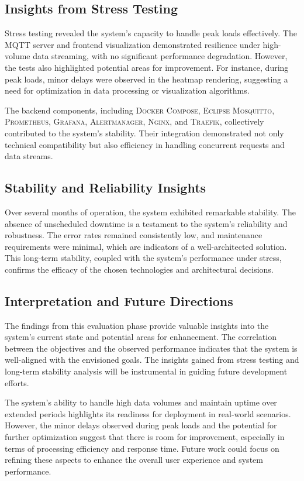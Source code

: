 \subsection{Insights from Stress Testing}
Stress testing revealed the system's capacity to handle peak loads effectively. The MQTT server and frontend visualization demonstrated resilience under high-volume data streaming, with no significant performance degradation. However, the tests also highlighted potential areas for improvement. For instance, during peak loads, minor delays were observed in the heatmap rendering, suggesting a need for optimization in data processing or visualization algorithms.

The backend components, including \textsc{Docker Compose}, \textsc{Eclipse Mosquitto}, \textsc{Prometheus}, \textsc{Grafana}, \textsc{Alertmanager}, \textsc{Nginx}, and \textsc{Traefik}, collectively contributed to the system's stability. Their integration demonstrated not only technical compatibility but also efficiency in handling concurrent requests and data streams.

\subsection{Stability and Reliability Insights}
Over several months of operation, the system exhibited remarkable stability. The absence of unscheduled downtime is a testament to the system's reliability and robustness. The error rates remained consistently low, and maintenance requirements were minimal, which are indicators of a well-architected solution. This long-term stability, coupled with the system's performance under stress, confirms the efficacy of the chosen technologies and architectural decisions.

\subsection{Interpretation and Future Directions}
The findings from this evaluation phase provide valuable insights into the system's current state and potential areas for enhancement. The correlation between the objectives and the observed performance indicates that the system is well-aligned with the envisioned goals. The insights gained from stress testing and long-term stability analysis will be instrumental in guiding future development efforts.

The system's ability to handle high data volumes and maintain uptime over extended periods highlights its readiness for deployment in real-world scenarios. However, the minor delays observed during peak loads and the potential for further optimization suggest that there is room for improvement, especially in terms of processing efficiency and response time. Future work could focus on refining these aspects to enhance the overall user experience and system performance.
